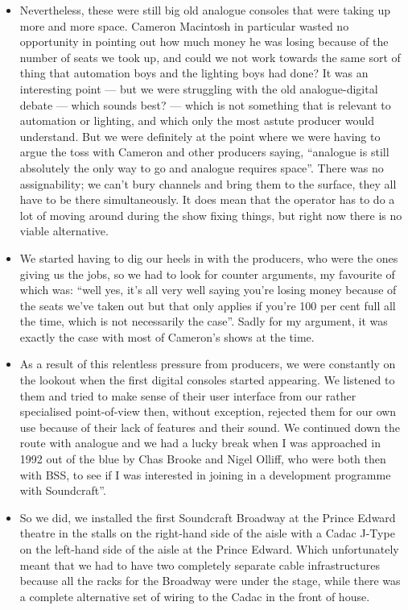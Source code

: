 \documentclass[12pt]{article}
\begin{document}
\begin{itemize}
            \item Nevertheless, these were still big old analogue consoles that were taking up more and more space. Cameron Macintosh in particular wasted no opportunity in pointing out how much money he was losing because of the number of seats we took up, and could we not work towards the same sort of thing that automation boys and the lighting boys had done? It was an interesting point --- but we were struggling with the old analogue-digital debate --- which sounds best? --- which is not something that is relevant to automation or lighting, and which only the most astute producer would understand. But we were definitely at the point where we were having to argue the toss with Cameron and other producers saying, “analogue is still absolutely the only way to go and analogue requires space”. There was no assignability; we can't bury channels and bring them to the surface, they all have to be there simultaneously. It does mean that the operator has to do a lot of moving around during the show fixing things, but right now there is no viable alternative.
            \item We started having to dig our heels in with the producers, who were the ones giving us the jobs, so we had to look for counter arguments, my favourite of which was: “well yes, it's all very well saying you're losing money because of the seats we've taken out but that only applies if you're 100 per cent full all the time, which is not necessarily the case”. Sadly for my argument, it was exactly the case with most of Cameron's shows at the time.
            \item As a result of this relentless pressure from producers, we were constantly on the lookout when the first digital consoles started appearing. We listened to them and tried to make sense of their user interface from our rather specialised point-of-view then, without exception, rejected them for our own use because of their lack of features and their sound. We continued down the route with analogue and we had a lucky break when I was approached in 1992 out of the blue by Chas Brooke and Nigel Olliff, who were both then with BSS, to see if I was interested in joining in a development programme with Soundcraft''.
            \item So we did, we installed the first Soundcraft Broadway at the Prince Edward theatre in the stalls on the right-hand side of the aisle with a Cadac J-Type on the left-hand side of the aisle at the Prince Edward. Which unfortunately meant that we had to have two completely separate cable infrastructures because all the racks for the Broadway were under the stage, while there was a complete alternative set of wiring to the Cadac in the front of house.

\end{itemize}
\end{document}
